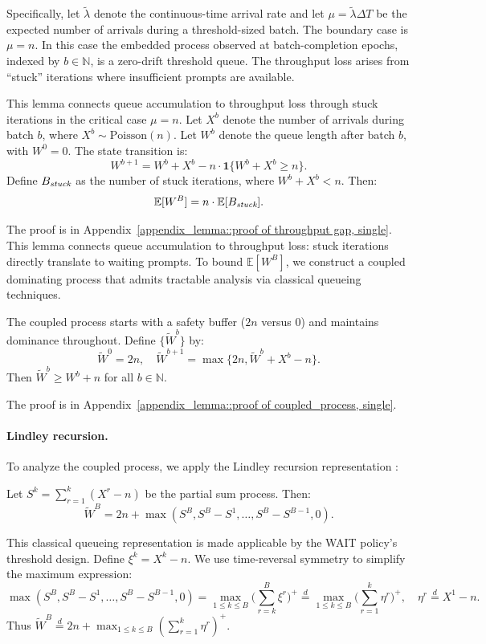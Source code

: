 Specifically, let \(\tilde{\lambda}\) denote the continuous-time arrival rate and let \(\mu=\tilde{\lambda}\Delta T\) be the expected number of arrivals during a threshold-sized batch. The boundary case is \(\mu=n\). In this case the embedded process observed at batch-completion epochs, indexed by \(b\in\mathbb{N}\), is a zero-drift threshold queue. The throughput loss arises from ``stuck'' iterations where insufficient prompts are available.

\begin{lemma}\label{lemma::throughput gap, single}
This lemma connects queue accumulation to throughput loss through stuck iterations in the critical case \(\mu=n\). Let \(X^b\) denote the number of arrivals during batch \(b\), where \(X^b \sim \mathrm{Poisson}(n)\). Let \(W^b\) denote the queue length after batch \(b\), with \(W^0=0\). The state transition is:
$$W^{b+1}=W^b+X^b-n\cdot \mathbf{1}\{W^b+X^b\geq n\}.$$
Define \(B_{\emph{stuck}}\) as the number of stuck iterations, where \(W^b+X^b<n\). Then:
$$\mathbb{E}[W^B]= n\cdot\mathbb{E}[B_{\emph{stuck}}].$$
\end{lemma}
\noindent The proof is in Appendix~\ref{appendix_lemma::proof of throughput gap, single}. This lemma connects queue accumulation to throughput loss: stuck iterations directly translate to waiting prompts. To bound $\mathbb{E}[W^B]$, we construct a coupled dominating process that admits tractable analysis via classical queueing techniques.

\begin{lemma}\label{lem:coupled_process, single}
The coupled process starts with a safety buffer (\(2n\) versus 0) and maintains dominance throughout. Define \(\{\tilde{W}^b\}\) by:
$$
\tilde{W}^0 = 2n, \quad \tilde{W}^{b+1} = \max\{ 2n, \tilde{W}^b + X^b - n \}.
$$
Then \(\tilde{W}^b \geq W^b + n\) for all \(b\in \mathbb{N}\).
\end{lemma}
\noindent The proof is in Appendix~\ref{appendix_lemma::proof of coupled_process, single}.

\paragraph{Lindley recursion.} To analyze the coupled process, we apply the Lindley recursion representation \citep[Proposition 6.3]{asmussen2003applied}:
\begin{lemma}\label{lem:lindley_rep}
Let \(S^k=\sum_{r=1}^k (X^r-n)\) be the partial sum process. Then:
$$\tilde{W}^B=2n+\max(S^B, S^B-S^1,\ldots,S^B-S^{B-1},0).$$
\end{lemma}
\noindent This classical queueing representation is made applicable by the WAIT policy's threshold design. Define \(\xi^k = X^k-n\). We use time-reversal symmetry to simplify the maximum expression:
$$\max(S^B, S^B-S^1,\ldots,S^B-S^{B-1},0)=\max_{1\leq k\leq B}\Big(\sum_{r=k}^{B}\xi^r\Big)^+\overset{d}{=}\max_{1\leq k\leq B}\Big(\sum_{r=1}^{k}\eta^r\Big)^+, \quad \eta^r\overset{d}{=}X^1-n.$$
Thus \(\tilde{W}^B \overset{d}{=}2n+\max_{1\leq k\leq B}(\sum_{r=1}^{k}\eta^r)^+\).

